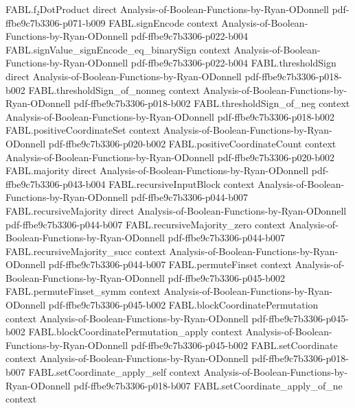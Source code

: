 \begin{theorem}
\proofstep
  {FABL.f₂DotProduct}
  {direct}
  {Analysis-of-Boolean-Functions-by-Ryan-ODonnell}
  {pdf-ffbe9c7b3306-p071-b009}
\proofstep
  {FABL.signEncode}
  {context}
  {Analysis-of-Boolean-Functions-by-Ryan-ODonnell}
  {pdf-ffbe9c7b3306-p022-b004}
\proofstep
  {FABL.signValue_signEncode_eq_binarySign}
  {context}
  {Analysis-of-Boolean-Functions-by-Ryan-ODonnell}
  {pdf-ffbe9c7b3306-p022-b004}
\proofstep
  {FABL.thresholdSign}
  {direct}
  {Analysis-of-Boolean-Functions-by-Ryan-ODonnell}
  {pdf-ffbe9c7b3306-p018-b002}
\proofstep
  {FABL.thresholdSign_of_nonneg}
  {context}
  {Analysis-of-Boolean-Functions-by-Ryan-ODonnell}
  {pdf-ffbe9c7b3306-p018-b002}
\proofstep
  {FABL.thresholdSign_of_neg}
  {context}
  {Analysis-of-Boolean-Functions-by-Ryan-ODonnell}
  {pdf-ffbe9c7b3306-p018-b002}
\proofstep
  {FABL.positiveCoordinateSet}
  {context}
  {Analysis-of-Boolean-Functions-by-Ryan-ODonnell}
  {pdf-ffbe9c7b3306-p020-b002}
\proofstep
  {FABL.positiveCoordinateCount}
  {context}
  {Analysis-of-Boolean-Functions-by-Ryan-ODonnell}
  {pdf-ffbe9c7b3306-p020-b002}
\proofstep
  {FABL.majority}
  {direct}
  {Analysis-of-Boolean-Functions-by-Ryan-ODonnell}
  {pdf-ffbe9c7b3306-p043-b004}
\proofstep
  {FABL.recursiveInputBlock}
  {context}
  {Analysis-of-Boolean-Functions-by-Ryan-ODonnell}
  {pdf-ffbe9c7b3306-p044-b007}
\proofstep
  {FABL.recursiveMajority}
  {direct}
  {Analysis-of-Boolean-Functions-by-Ryan-ODonnell}
  {pdf-ffbe9c7b3306-p044-b007}
\proofstep
  {FABL.recursiveMajority_zero}
  {context}
  {Analysis-of-Boolean-Functions-by-Ryan-ODonnell}
  {pdf-ffbe9c7b3306-p044-b007}
\proofstep
  {FABL.recursiveMajority_succ}
  {context}
  {Analysis-of-Boolean-Functions-by-Ryan-ODonnell}
  {pdf-ffbe9c7b3306-p044-b007}
\proofstep
  {FABL.permuteFinset}
  {context}
  {Analysis-of-Boolean-Functions-by-Ryan-ODonnell}
  {pdf-ffbe9c7b3306-p045-b002}
\proofstep
  {FABL.permuteFinset_symm}
  {context}
  {Analysis-of-Boolean-Functions-by-Ryan-ODonnell}
  {pdf-ffbe9c7b3306-p045-b002}
\proofstep
  {FABL.blockCoordinatePermutation}
  {context}
  {Analysis-of-Boolean-Functions-by-Ryan-ODonnell}
  {pdf-ffbe9c7b3306-p045-b002}
\proofstep
  {FABL.blockCoordinatePermutation_apply}
  {context}
  {Analysis-of-Boolean-Functions-by-Ryan-ODonnell}
  {pdf-ffbe9c7b3306-p045-b002}
\proofstep
  {FABL.setCoordinate}
  {context}
  {Analysis-of-Boolean-Functions-by-Ryan-ODonnell}
  {pdf-ffbe9c7b3306-p018-b007}
\proofstep
  {FABL.setCoordinate_apply_self}
  {context}
  {Analysis-of-Boolean-Functions-by-Ryan-ODonnell}
  {pdf-ffbe9c7b3306-p018-b007}
\proofstep
  {FABL.setCoordinate_apply_of_ne}
  {context}

\end{theorem}
